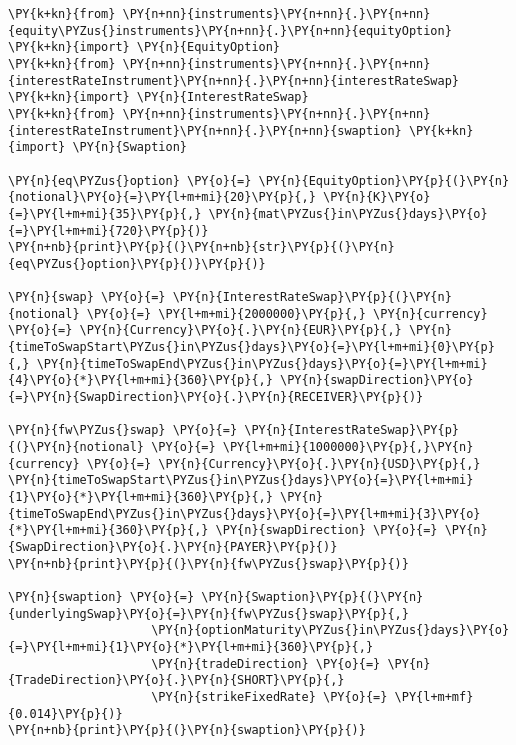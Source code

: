     \begin{tcolorbox}[breakable, size=fbox, boxrule=1pt, pad at break*=1mm,colback=cellbackground, colframe=cellborder]
\begin{Verbatim}[commandchars=\\\{\}]
\PY{k+kn}{from} \PY{n+nn}{instruments}\PY{n+nn}{.}\PY{n+nn}{equity\PYZus{}instruments}\PY{n+nn}{.}\PY{n+nn}{equityOption} \PY{k+kn}{import} \PY{n}{EquityOption}
\PY{k+kn}{from} \PY{n+nn}{instruments}\PY{n+nn}{.}\PY{n+nn}{interestRateInstrument}\PY{n+nn}{.}\PY{n+nn}{interestRateSwap} \PY{k+kn}{import} \PY{n}{InterestRateSwap}
\PY{k+kn}{from} \PY{n+nn}{instruments}\PY{n+nn}{.}\PY{n+nn}{interestRateInstrument}\PY{n+nn}{.}\PY{n+nn}{swaption} \PY{k+kn}{import} \PY{n}{Swaption}

\PY{n}{eq\PYZus{}option} \PY{o}{=} \PY{n}{EquityOption}\PY{p}{(}\PY{n}{notional}\PY{o}{=}\PY{l+m+mi}{20}\PY{p}{,} \PY{n}{K}\PY{o}{=}\PY{l+m+mi}{35}\PY{p}{,} \PY{n}{mat\PYZus{}in\PYZus{}days}\PY{o}{=}\PY{l+m+mi}{720}\PY{p}{)}
\PY{n+nb}{print}\PY{p}{(}\PY{n+nb}{str}\PY{p}{(}\PY{n}{eq\PYZus{}option}\PY{p}{)}\PY{p}{)}

\PY{n}{swap} \PY{o}{=} \PY{n}{InterestRateSwap}\PY{p}{(}\PY{n}{notional} \PY{o}{=} \PY{l+m+mi}{2000000}\PY{p}{,} \PY{n}{currency} \PY{o}{=} \PY{n}{Currency}\PY{o}{.}\PY{n}{EUR}\PY{p}{,} \PY{n}{timeToSwapStart\PYZus{}in\PYZus{}days}\PY{o}{=}\PY{l+m+mi}{0}\PY{p}{,} \PY{n}{timeToSwapEnd\PYZus{}in\PYZus{}days}\PY{o}{=}\PY{l+m+mi}{4}\PY{o}{*}\PY{l+m+mi}{360}\PY{p}{,} \PY{n}{swapDirection}\PY{o}{=}\PY{n}{SwapDirection}\PY{o}{.}\PY{n}{RECEIVER}\PY{p}{)}

\PY{n}{fw\PYZus{}swap} \PY{o}{=} \PY{n}{InterestRateSwap}\PY{p}{(}\PY{n}{notional} \PY{o}{=} \PY{l+m+mi}{1000000}\PY{p}{,}\PY{n}{currency} \PY{o}{=} \PY{n}{Currency}\PY{o}{.}\PY{n}{USD}\PY{p}{,} \PY{n}{timeToSwapStart\PYZus{}in\PYZus{}days}\PY{o}{=}\PY{l+m+mi}{1}\PY{o}{*}\PY{l+m+mi}{360}\PY{p}{,} \PY{n}{timeToSwapEnd\PYZus{}in\PYZus{}days}\PY{o}{=}\PY{l+m+mi}{3}\PY{o}{*}\PY{l+m+mi}{360}\PY{p}{,} \PY{n}{swapDirection} \PY{o}{=} \PY{n}{SwapDirection}\PY{o}{.}\PY{n}{PAYER}\PY{p}{)}
\PY{n+nb}{print}\PY{p}{(}\PY{n}{fw\PYZus{}swap}\PY{p}{)}

\PY{n}{swaption} \PY{o}{=} \PY{n}{Swaption}\PY{p}{(}\PY{n}{underlyingSwap}\PY{o}{=}\PY{n}{fw\PYZus{}swap}\PY{p}{,}
                    \PY{n}{optionMaturity\PYZus{}in\PYZus{}days}\PY{o}{=}\PY{l+m+mi}{1}\PY{o}{*}\PY{l+m+mi}{360}\PY{p}{,}
                    \PY{n}{tradeDirection} \PY{o}{=} \PY{n}{TradeDirection}\PY{o}{.}\PY{n}{SHORT}\PY{p}{,}
                    \PY{n}{strikeFixedRate} \PY{o}{=} \PY{l+m+mf}{0.014}\PY{p}{)}
\PY{n+nb}{print}\PY{p}{(}\PY{n}{swaption}\PY{p}{)}
\end{Verbatim}
\end{tcolorbox}

